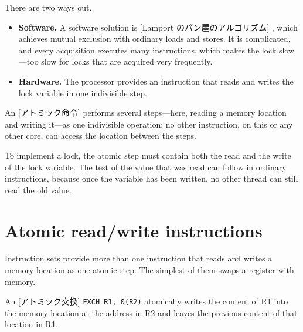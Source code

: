 \documentclass[../main.tex]{subfiles}
\begin{document}
There are two ways out.
\begin{itemize}
  \item \textbf{Software.}  A software solution is
    [Lamport のパン屋のアルゴリズム]
    \cite{lamport1974}, which achieves mutual exclusion with ordinary loads
    and stores.  It is complicated, and every acquisition executes many
    instructions, which makes the lock slow---too slow for locks that are
    acquired very frequently.
  \item \textbf{Hardware.}  The processor provides an instruction that reads
    and writes the lock variable in one indivisible step.
\end{itemize}

\begin{definition}
  An [アトミック命令] performs several steps---here,
  reading a memory location and writing it---as one indivisible operation:
  no other instruction, on this or any other core, can access the location
  between the steps.
\end{definition}

To implement a lock, the atomic step must contain both the read and the
write of the lock variable.  The test of the value that was read can follow
in ordinary instructions, because once the variable has been written, no
other thread can still read the old value.

\section{Atomic read/write instructions}
\label{sec:l20-atomic}

Instruction sets provide more than one instruction that reads and writes a
memory location as one atomic step.  The simplest of them swaps a register with memory.

\begin{definition}
  An [アトミック交換] \texttt{EXCH R1, 0(R2)}
  atomically writes the content of R1 into the memory location at the
  address in R2 and leaves the previous content of that location in R1.
\end{definition}
\end{document}

